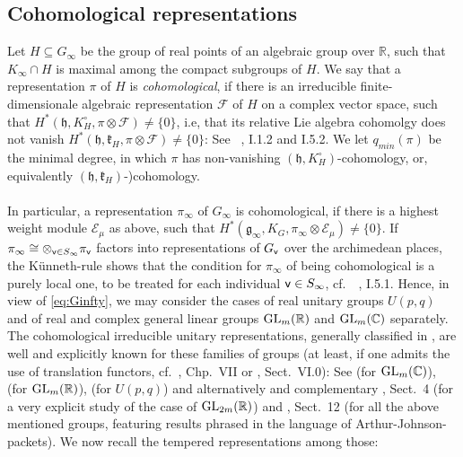 \documentclass[a4paper,10pt]{amsart}
\theoremstyle{definition}
\numberwithin{equation}{section}
\def\R{\mathbb R}
\def\C{\mathbb C}
\def\EE{\mathcal E}
\def\cF{\mathcal F}
\def\g{\mathfrak g}
\def\h{\mathfrak h}
\def\k{\mathfrak k}
\def\GL{{\rm GL}}
\def\vv{{\sf v}} %
\begin{document}
\subsection{Cohomological representations}
Let $H\subseteq G_\infty$ be the group of real points of an algebraic group over $\R$, such that $K_\infty\cap H$ is maximal among the compact subgroups of $H$. We say that a representation $\pi$ of $H$ is {\it cohomological}, if there is an irreducible finite-dimensionale algebraic representation $\cF$ of $H$ on a complex vector space, such that $H^*(\h, K^\circ_H,\pi\otimes \cF)\neq \{0\}$, i.e, that its relative Lie algebra cohomolgy does not vanish $H^*(\h, \k_H,\pi\otimes \cF)\neq \{0\}$: See \ \cite{bowa}, I.1.2 and I.5.2. We let $q_{min}(\pi)$ be the minimal degree, in which $\pi$ has non-vanishing $(\h, K^\circ_H)$-cohomology, or, equivalently $(\h, \k_H)$-)cohomology.\\\\In particular, a representation $\pi_\infty$ of $G_\infty$ is cohomological, if there is a highest weight module $\EE_\mu$ as above, such that $H^*(\g_{\infty},K_{G},\pi_\infty\otimes \EE_\mu)\neq \{0\}$. If $\pi_\infty\cong\otimes_{\vv\in S_\infty}\pi_\vv$ factors into representations of $G_\vv$ over the archimedean places, the K\"unneth-rule shows that the condition for $\pi_\infty$ of being cohomological is a purely local one, to be treated for each individual $\vv\in S_\infty$, cf.\ \ \cite{bowa}, I.5.1. Hence, in view of \eqref{eq:Ginfty}, we may consider the cases of real unitary groups $U(p,q)$ and of real and complex general linear groups $\GL_m(\R)$ and $\GL_m(\C)$ separately. The cohomological irreducible unitary representations, generally classified in \cite{vozu, voganunit}, are well and explicitly known for these families of groups (at least, if one admits the use of translation functors, cf.\ \cite{knappvogan}, Chp.\ VII or \cite{bowa}, Sect.\ VI.0): See \cite{enright} (for $\GL_m(\C)$), \cite{speh, speh81}  (for $\GL_m(\R)$), \cite{voganupq, salamribsu} (for $U(p,q)$) and alternatively and complementary \cite{grob-ragh}, Sect.\ 4 (for a very explicit study of the case of $\GL_{2m}(\R)$) and \cite{nairprasad}, Sect.\ 12 (for all the above mentioned groups, featuring results phrased in the language of Arthur-Johnson-packets). We now recall the tempered representations among those:
\end{document}
